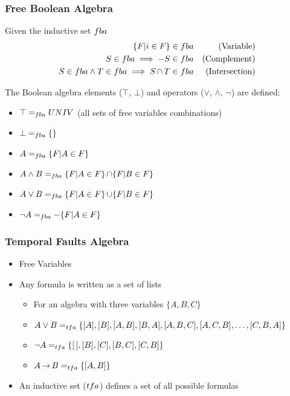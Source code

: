 \begin{frame}
\frametitle{Free Boolean Algebra}
Given the inductive set $fba$
\begin{subequations}
\begin{align}
\{F | i \in F \} & \in fba & \text{(Variable)}\\
S \in fba \implies -S & \in fba & \text{(Complement)}\\
S \in fba \land T \in fba \implies S \operatorname{\cap} T & \in fba & \text{(Intersection)}
\end{align}
\end{subequations}

The Boolean algebra elements ($\top$, $\bot$) and operators ($\lor$, $\land$, $\lnot$) are defined:
\begin{itemize}
  \item $\top =_{fba} UNIV$ (all sets of free variables combinations)
  \item $\bot =_{fba} \{\}$
  \item $A =_{fba} \{F | A \in F\} $
  \item $A \land B =_{fba} \{F | A \in F \} \operatorname{\cap} \{F | B \in F\}$ 
  \item $A \lor B =_{fba} \{F | A \in F \} \operatorname{\cup} \{F | B \in F\}$
  \item $\lnot A =_{fba} - \{F | A \in F\}$
\end{itemize}
\end{frame}

\begin{frame}
\frametitle{Temporal Faults Algebra}

\begin{itemize}
  \item Free Variables
  \item Any formula is written as a set of lists
    \begin{itemize}
      \item For an algebra with three variables $\{A,B,C\}$
      \item $A \lor B =_{tfa} \{ [A], [B], [A,B], [B,A], [A,B,C], [A,C,B], \ldots, [C,B,A]  \}$
      \item $\lnot A =_{tfa} \{ [\,], [B], [C], [B,C], [C,B] \} $
      \item $A \operatorname{\rightarrow} B =_{tfa} \{ [A,B] \}$
    \end{itemize}  
  \item An inductive set ($tfa$) defines a set of all possible formulas
\end{itemize}
\end{frame}


